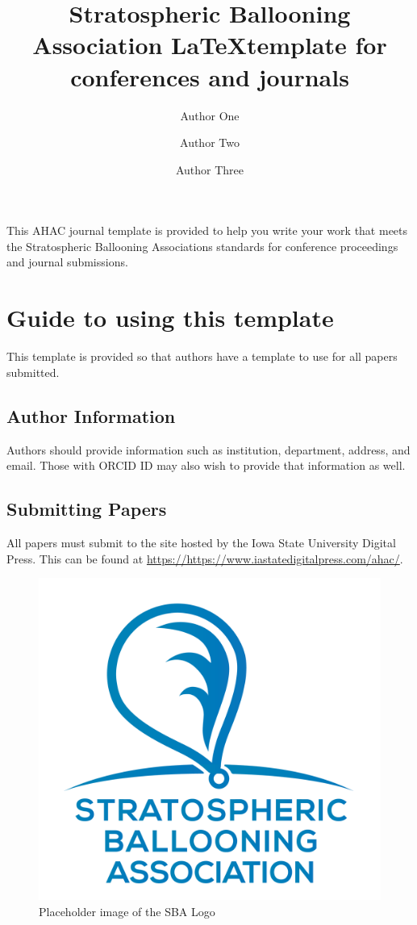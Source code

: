 \documentclass[12pt]{sba}
\title{Stratospheric Ballooning Association \LaTeX template for conferences and journals}
\author[a]{Author One}
\author[b]{Author Two}
\author[c]{Author Three}
\affil[a]{Affiliation One}
\affil[b]{Affiliation Two}
\affil[c]{Affiliation Three}
\begin{document}
\maketitle
{}

\showacknow %
\newpage
\justifying
\noindent This AHAC journal template is provided to help you write your work that meets the Stratospheric Ballooning Associations standards for conference proceedings and journal submissions.

\section*{Guide to using this template}

This template is provided so that authors have a template to use for all papers submitted. 

\subsection*{Author Information}
Authors should provide information such as institution, department, address, and email.  Those with ORCID ID may also wish to provide that information as well.

\subsection*{Submitting Papers}
All papers must submit to the site hosted by the Iowa State University Digital Press.  This can be found at \href{https://www.iastatedigitalpress.com/ahac/}{https://https://www.iastatedigitalpress.com/ahac/}. 

\begin{figure}%
\centering
\includegraphics[width=.8\linewidth]{images/SBA_logo.png}
\caption{Placeholder image of the SBA Logo}
\label{fig:SBA}
\end{figure}
\end{document}
